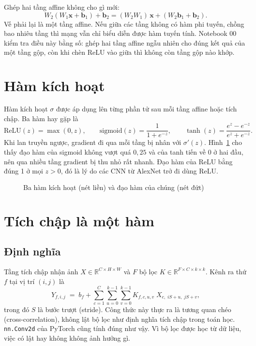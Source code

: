 Ghép hai tầng affine không cho gì mới:
\[
  W_2(W_1\mathbf{x}+\mathbf{b}_1)+\mathbf{b}_2 = (W_2W_1)\,\mathbf{x} + (W_2\mathbf{b}_1+\mathbf{b}_2).
\]
Vế phải lại là một tầng affine. Nếu giữa các tầng không có hàm phi tuyến, chồng bao nhiêu tầng thì
mạng vẫn chỉ biểu diễn được hàm tuyến tính. Notebook 00 kiểm tra điều này bằng số: ghép hai tầng affine
ngẫu nhiên cho đúng kết quả của một tầng gộp, còn khi chèn ReLU vào giữa thì không còn tầng gộp nào khớp.


\section{Hàm kích hoạt}

Hàm kích hoạt $\sigma$ được áp dụng lên từng phần tử sau mỗi tầng affine hoặc tích chập. Ba hàm hay gặp là
\[
  \mathrm{ReLU}(z)=\max(0,z),\qquad
  \mathrm{sigmoid}(z)=\frac{1}{1+e^{-z}},\qquad
  \tanh(z)=\frac{e^{z}-e^{-z}}{e^{z}+e^{-z}} .
\]
Khi lan truyền ngược, gradient đi qua mỗi tầng bị nhân với $\sigma'(z)$. Hình~\ref{fig:kichhoat} cho thấy
đạo hàm của sigmoid không vượt quá $0{,}25$ và của tanh tiến về 0 ở hai đầu, nên qua nhiều tầng gradient bị
thu nhỏ rất nhanh. Đạo hàm của ReLU bằng đúng 1 ở mọi $z>0$, đó là lý do các CNN từ AlexNet trở đi dùng ReLU.

\begin{figure}[H]
  \centering
  \caption{Ba hàm kích hoạt (nét liền) và đạo hàm của chúng (nét đứt)}
  \label{fig:kichhoat}
\end{figure}


\section{Tích chập là một hàm}

\subsection{Định nghĩa}

Tầng tích chập nhận ảnh $X\in\mathbb{R}^{C\times H\times W}$ và $F$ bộ lọc $K\in\mathbb{R}^{F\times C\times k\times k}$.
Kênh ra thứ $f$ tại vị trí $(i,j)$ là
\[
  Y_{f,i,j} \;=\; b_f + \sum_{c=1}^{C}\sum_{u=0}^{k-1}\sum_{v=0}^{k-1}
      K_{f,c,u,v}\; X_{c,\; iS+u,\; jS+v},
\]
trong đó $S$ là bước trượt (stride). Công thức này thực ra là tương quan chéo (cross-correlation), không lật
bộ lọc như định nghĩa tích chập trong toán học. \texttt{nn.Conv2d} của PyTorch cũng tính đúng như vậy.
Vì bộ lọc được học từ dữ liệu, việc có lật hay không không ảnh hưởng gì.

